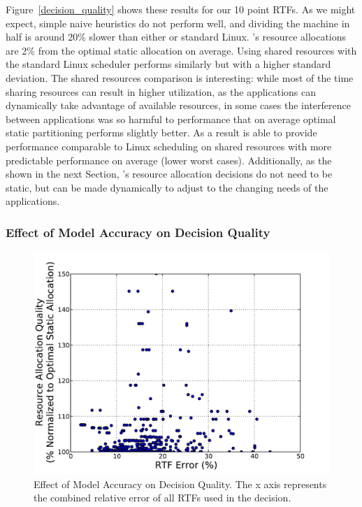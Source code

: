 Figure~\ref{decision_quality} shows these results for our 10 point RTFs. As we might expect, simple naive heuristics do not perform well, and dividing the machine in half is around 20\% slower than either \pacora or standard Linux.
 \pacora's resource allocations are 2\% from the optimal static allocation on average.  Using shared resources with the standard Linux scheduler performs similarly but with a higher standard deviation.  The shared resources comparison is interesting: while most of the time sharing resources can result in higher utilization, as the applications can dynamically take advantage of available resources, in some cases the interference between applications was so harmful to performance that on average optimal static partitioning performs slightly better.  As a result \pacora is able to provide performance comparable to Linux scheduling on shared resources with more predictable performance on average (lower worst cases).  Additionally, as the shown in the next Section, \pacora's resource allocation decisions do not need to be static, but can be made dynamically to adjust to the changing needs of the applications.

\subsubsection{Effect of Model Accuracy on Decision Quality}

\begin{figure}[!t]
	\begin{center}	
		\includegraphics[bb=0 0 576 432,width=\columnwidth]{Figures/accuracy_quality.pdf}
		\caption{Effect of Model Accuracy on Decision Quality. The x axis represents the combined relative error of all RTFs used in the decision.}
		\label{accuracy_quality}
	\end{center}
\end{figure}


